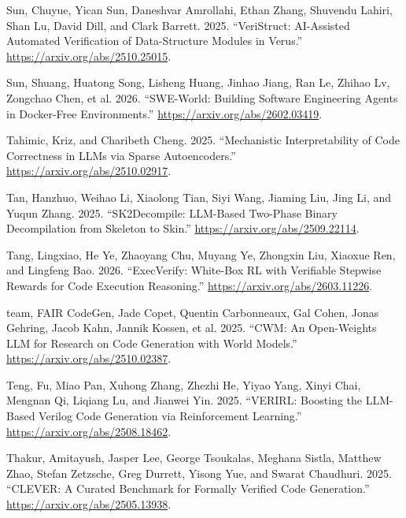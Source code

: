 \documentclass{article}
\newlength{\cslhangindent}
\newenvironment{CSLReferences}[2]
 {%
  \setlength{\parindent}{0pt}
  \everypar{\setlength{\hangindent}{\cslhangindent}}\ignorespaces
 }
 {\par}
\begin{document}
\begin{CSLReferences}{1}{0}
\leavevmode{}%
Sun, Chuyue, Yican Sun, Daneshvar Amrollahi, Ethan Zhang, Shuvendu
Lahiri, Shan Lu, David Dill, and Clark Barrett. 2025. {``VeriStruct:
AI-Assisted Automated Verification of Data-Structure Modules in
Verus.''} \url{https://arxiv.org/abs/2510.25015}.

\leavevmode{}%
Sun, Shuang, Huatong Song, Lisheng Huang, Jinhao Jiang, Ran Le, Zhihao
Lv, Zongchao Chen, et al. 2026. {``SWE-World: Building Software
Engineering Agents in Docker-Free Environments.''}
\url{https://arxiv.org/abs/2602.03419}.

\leavevmode{}%
Tahimic, Kriz, and Charibeth Cheng. 2025. {``Mechanistic
Interpretability of Code Correctness in LLMs via Sparse Autoencoders.''}
\url{https://arxiv.org/abs/2510.02917}.

\leavevmode{}%
Tan, Hanzhuo, Weihao Li, Xiaolong Tian, Siyi Wang, Jiaming Liu, Jing Li,
and Yuqun Zhang. 2025. {``SK2Decompile: LLM-Based Two-Phase Binary
Decompilation from Skeleton to Skin.''}
\url{https://arxiv.org/abs/2509.22114}.

\leavevmode{}%
Tang, Lingxiao, He Ye, Zhaoyang Chu, Muyang Ye, Zhongxin Liu, Xiaoxue
Ren, and Lingfeng Bao. 2026. {``ExecVerify: White-Box RL with Verifiable
Stepwise Rewards for Code Execution Reasoning.''}
\url{https://arxiv.org/abs/2603.11226}.

\leavevmode{}%
team, FAIR CodeGen, Jade Copet, Quentin Carbonneaux, Gal Cohen, Jonas
Gehring, Jacob Kahn, Jannik Kossen, et al. 2025. {``CWM: An Open-Weights
LLM for Research on Code Generation with World Models.''}
\url{https://arxiv.org/abs/2510.02387}.

\leavevmode{}%
Teng, Fu, Miao Pan, Xuhong Zhang, Zhezhi He, Yiyao Yang, Xinyi Chai,
Mengnan Qi, Liqiang Lu, and Jianwei Yin. 2025. {``VERIRL: Boosting the
LLM-Based Verilog Code Generation via Reinforcement Learning.''}
\url{https://arxiv.org/abs/2508.18462}.

\leavevmode{}%
Thakur, Amitayush, Jasper Lee, George Tsoukalas, Meghana Sistla, Matthew
Zhao, Stefan Zetzsche, Greg Durrett, Yisong Yue, and Swarat Chaudhuri.
2025. {``CLEVER: A Curated Benchmark for Formally Verified Code
Generation.''} \url{https://arxiv.org/abs/2505.13938}.


\end{CSLReferences}
\end{document}
